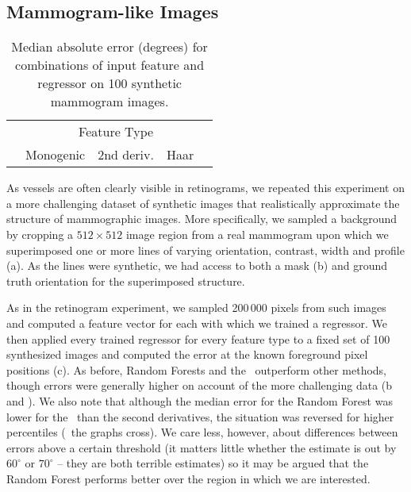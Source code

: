 \subsection{Mammogram-like Images}
\label{s:expts_synth_mammography}
\begin{table}[t]
\centering
\begin{tabular}{l|c c c c}
							& \multicolumn{4}{c}{Feature Type} \\
							& Monogenic		& 2nd deriv.	& Haar				& \dtcwt \\
\hline

\end{tabular}
%
\caption{Median absolute error (degrees) for combinations of input feature and regressor on 100 synthetic mammogram images.}
\label{t:synth_mammography}
\end{table}

As vessels are often clearly visible in retinograms, we repeated this experiment on a more challenging dataset of synthetic images that realistically approximate the structure of mammographic images. More specifically, we sampled a background by cropping a $512{\times}512$ image region from a real mammogram upon which we superimposed one or more lines of varying orientation, contrast, width and profile (a). As the lines were synthetic, we had access to both a mask (b) and ground truth orientation for the superimposed structure.

As in the retinogram experiment, we sampled 200\,000 pixels from such images and computed a feature vector for each with which we trained a regressor. We then applied every trained regressor for every feature type to a fixed set of 100 synthesized images and computed the error at the known foreground pixel positions (c). As before, Random Forests and the \dtcwt~outperform other methods, though errors were generally higher on account of the more challenging data (b and ). We also note that although the median error for the Random Forest was lower for the \dtcwt~than the second derivatives, the situation was reversed for higher percentiles (\ie~the graphs cross). We care less, however, about differences between errors above a certain threshold (it matters little whether the estimate is out by $60^\circ$ or $70^\circ$ -- they are both terrible estimates) so it may be argued that the Random Forest performs better over the region in which we are interested.

